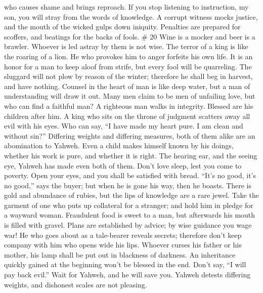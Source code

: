 who causes shame and brings reproach.  If you stop
listening to instruction, my son, you will stray from the words of
knowledge.  A corrupt witness mocks justice, and the mouth
of the wicked gulps down iniquity.  Penalties are prepared
for scoffers, and beatings for the backs of fools. \# 20 
Wine is a mocker and beer is a brawler. Whoever is led astray by them is
not wise.  The terror of a king is like the roaring of a
lion. He who provokes him to anger forfeits his own life. 
It is an honor for a man to keep aloof from strife, but every fool will
be quarreling.  The sluggard will not plow by reason of the
winter; therefore he shall beg in harvest, and have nothing.
 Counsel in the heart of man is like deep water, but a man
of understanding will draw it out.  Many men claim to be men
of unfailing love, but who can find a faithful man?  A
righteous man walks in integrity. Blessed are his children after him.
 A king who sits on the throne of judgment scatters away all
evil with his eyes.  Who can say, ``I have made my heart
pure. I am clean and without sin?''  Differing weights and
differing measures, both of them alike are an abomination to Yahweh.
 Even a child makes himself known by his doings, whether
his work is pure, and whether it is right.  The hearing
ear, and the seeing eye, Yahweh has made even both of them.
 Don't love sleep, lest you come to poverty. Open your
eyes, and you shall be satisfied with bread.  ``It's no
good, it's no good,'' says the buyer; but when he is gone his way, then
he boasts.  There is gold and abundance of rubies, but the
lips of knowledge are a rare jewel.  Take the garment of
one who puts up collateral for a stranger; and hold him in pledge for a
wayward woman.  Fraudulent food is sweet to a man, but
afterwards his mouth is filled with gravel.  Plans are
established by advice; by wise guidance you wage war!  He
who goes about as a tale-bearer reveals secrets; therefore don't keep
company with him who opens wide his lips.  Whoever curses
his father or his mother, his lamp shall be put out in blackness of
darkness.  An inheritance quickly gained at the beginning
won't be blessed in the end.  Don't say, ``I will pay back
evil.'' Wait for Yahweh, and he will save you.  Yahweh
detests differing weights, and dishonest scales are not pleasing.
